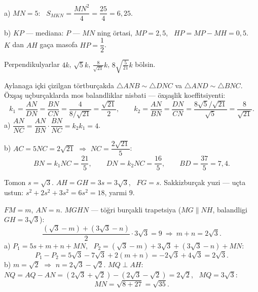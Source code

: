 a) $MN=5$: \ $S_{MKN}=\dfrac{MN^2}4=\dfrac{25}4=6{,}25$.

b) $KP$ — mediana: $P$ — $MN$ ning örtasi, $MP=2{,}5$, \ $HP=MP-MH=0{,}5$. \ $K$ dan $AH$ gaça masofa $HP=\dfrac12$.

\newpage
{}
Perpendikulyarlar $4k$, $\sqrt5k$, $\frac8{\sqrt{21}}k$, $8\sqrt{\frac5{21}}k$ bölsin.

Aylanaga içki çizilgan törtburçakda $\triangle ANB\sim\triangle DNC$ va $\triangle AND\sim\triangle BNC$. Öxşaş uçburçaklarda mos balandliklar nisbati — öxşaşlik koeffitsiyenti:
\[k_1=\frac{AN}{DN}=\frac{BN}{CN}=\frac{4}{8/\sqrt{21}}=\frac{\sqrt{21}}2,\qquad k_2=\frac{AN}{BN}=\frac{DN}{CN}=\frac{8\sqrt5/\sqrt{21}}{\sqrt5}=\frac8{\sqrt{21}}.\]
a) $\dfrac{AN}{NC}=\dfrac{AN}{BN}\cdot\dfrac{BN}{NC}=k_2k_1=4$.

b) $AC=5NC=2\sqrt{21}$ $\Rightarrow$ $NC=\dfrac{2\sqrt{21}}5$:
\[BN=k_1NC=\frac{21}5,\qquad DN=k_2NC=\frac{16}5,\qquad BD=\frac{37}5=7{,}4.\]

\newpage
{}
Tomon $s=\sqrt3$. $AH=GH=3s=3\sqrt3$, \ $FG=s$. Sakkizburçak yuzi — uçta ustun: $s^2+2s^2+3s^2=6s^2=18$, yarmi $9$.

$FM=m$, $AN=n$. $MGHN$ — töğri burçakli trapetsiya ($MG\parallel NH$, balandligi $GH=3\sqrt3$):
\[\frac{\left(\sqrt3-m\right)+\left(3\sqrt3-n\right)}2\cdot3\sqrt3=9\ \Rightarrow\ m+n=2\sqrt3.\]
a) $P_1=5s+m+n+MN$, \ $P_2=\left(\sqrt3-m\right)+3\sqrt3+\left(3\sqrt3-n\right)+MN$:
\[P_1-P_2=5\sqrt3-7\sqrt3+2(m+n)=-2\sqrt3+4\sqrt3=2\sqrt3.\]
b) $m=\sqrt2$ $\Rightarrow$ $n=2\sqrt3-\sqrt2$. $MQ\perp AH$: $NQ=AQ-AN=\left(2\sqrt3+\sqrt2\right)-\left(2\sqrt3-\sqrt2\right)=2\sqrt2$, \ $MQ=3\sqrt3$:
\[MN=\sqrt{8+27}=\sqrt{35}.\]

